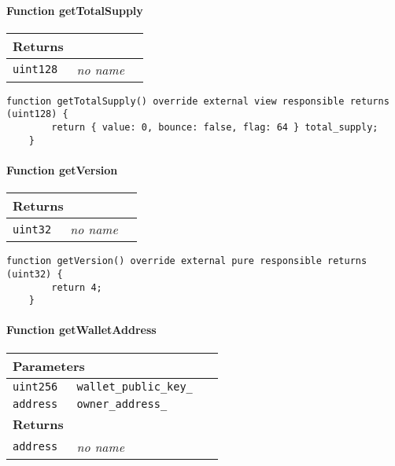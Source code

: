 \paragraph{Function getTotalSupply}


\ifsoltables
\noindent\begin{tabular}{|l|l|p{5cm}|}\hline
\multicolumn{3}{|l|}{\bf Returns}\\\hline
\tt uint128 & {\em no name} &\\\hline
\end{tabular}
\fi

\vspace{2cm}

\begin{lstlisting}[firstnumber=92]
    function getTotalSupply() override external view responsible returns (uint128) {
        return { value: 0, bounce: false, flag: 64 } total_supply;
    }
\end{lstlisting}

\paragraph{Function getVersion}


\ifsoltables
\noindent\begin{tabular}{|l|l|p{5cm}|}\hline
\multicolumn{3}{|l|}{\bf Returns}\\\hline
\tt uint32 & {\em no name} &\\\hline
\end{tabular}
\fi

\vspace{2cm}

\begin{lstlisting}[firstnumber=63]
    function getVersion() override external pure responsible returns (uint32) {
        return 4;
    }
\end{lstlisting}

\paragraph{Function getWalletAddress}


\ifsoltables
\noindent\begin{tabular}{|l|l|p{5cm}|}\hline
\multicolumn{3}{|l|}{\bf Parameters}\\\hline
\tt uint256 & \tt wallet\_{}public\_{}key\_{} &\\\hline
\tt address & \tt owner\_{}address\_{} &\\\hline
\multicolumn{3}{|l|}{\bf Returns}\\\hline
\tt address & {\em no name} &\\\hline
\end{tabular}
\fi

